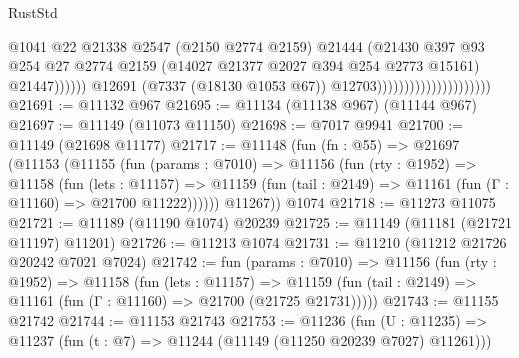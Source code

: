 \begin{lexlean}{RustStd}
\begin{coremodule}
                                                        @1041
                                                        @22
                                                        @21338
                                                        @2547
                                                        (@2150 @2774 @2159)
                                                        @21444
                                                        (@21430
                                                          @397
                                                          @93
                                                          @254
                                                          @27
                                                          @2774
                                                          @2159
                                                          (@14027
                                                            @21377
                                                            @2027
                                                            @394
                                                            @254
                                                            @2773
                                                            @15161)
                                                          @21447))))))
                                              @12691
                                              (@7337 (@18130 @1053 @67))
                                              @12703)))))))))))))))))))))
@21691 := @11132 @967
@21695 := @11134 (@11138 @967) (@11144 @967)
@21697 := @11149 (@11073 @11150)
@21698 := @7017 @9941
@21700 := @11149 (@21698 @11177)
@21717 := @11148
    (fun (fn : @55) =>
    @21697
      (@11153
        (@11155
          (fun (params : @7010) =>
          @11156
            (fun (rty : @1952) =>
            @11158
              (fun (lets : @11157) =>
              @11159 (fun (tail : @2149) => @11161 (fun (Γ : @11160) => @21700 @11222))))))
        @11267))
    @1074
@21718 := @11273 @11075
@21721 := @11189 (@11190 @1074) @20239
@21725 := @11149 (@11181 (@21721 @11197) @11201)
@21726 := @11213 @1074
@21731 := @11210 (@11212 @21726 @20242 @7021 @7024)
@21742 := fun (params : @7010) =>
  @11156
    (fun (rty : @1952) =>
    @11158
      (fun (lets : @11157) =>
      @11159 (fun (tail : @2149) => @11161 (fun (Γ : @11160) => @21700 (@21725 @21731)))))
@21743 := @11155 @21742
@21744 := @11153 @21743
@21753 := @11236
    (fun (U : @11235) => @11237 (fun (t : @7) => @11244 (@11149 (@11250 @20239 @7027) @11261)))

\end{coremodule}
\end{lexlean}
